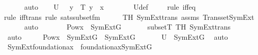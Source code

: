 \begin{isabellebody}
\ \ \ \ \isamarkupfalse%
\ auto\isanewline
\isanewline
\ \ \isamarkupfalse%
\ {\isachardoublequoteopen}U\ {\isacharequal}{\kern0pt}\ {\isacharbraceleft}{\kern0pt}\ y\ {\isasymin}\ T{\isachardot}{\kern0pt}\ y\ {\isasymsubseteq}\ x\ {\isacharbraceright}{\kern0pt}{\isachardoublequoteclose}\ \isanewline
\ \ \ \ \isamarkupfalse%
\ U{\isacharunderscore}{\kern0pt}def\isanewline
\ \ \ \ \isamarkupfalse%
{\isacharparenleft}{\kern0pt}rule\ iff{\isacharunderscore}{\kern0pt}eq{\isacharparenright}{\kern0pt}\isanewline
\ \ \ \ \isamarkupfalse%
{\isacharparenleft}{\kern0pt}rule\ iff{\isacharunderscore}{\kern0pt}trans{\isacharcomma}{\kern0pt}\ rule\ sats{\isacharunderscore}{\kern0pt}subset{\isacharunderscore}{\kern0pt}fm{\isacharparenright}{\kern0pt}\isanewline
\ \ \ \ \isamarkupfalse%
\ TH\ SymExt{\isacharunderscore}{\kern0pt}trans\ assms\ Transset{\isacharunderscore}{\kern0pt}SymExt\isanewline
\ \ \ \ \isamarkupfalse%
\ auto\isanewline
\ \ \isamarkupfalse%
\ \isamarkupfalse%
\ {\isachardoublequoteopen}{\isachardot}{\kern0pt}{\isachardot}{\kern0pt}{\isachardot}{\kern0pt}\ {\isacharequal}{\kern0pt}\ Pow{\isacharparenleft}{\kern0pt}x{\isacharparenright}{\kern0pt}\ {\isasyminter}\ SymExt{\isacharparenleft}{\kern0pt}G{\isacharparenright}{\kern0pt}{\isachardoublequoteclose}\ \isanewline
\ \ \ \ \isamarkupfalse%
\ subsetT\ TH\ SymExt{\isacharunderscore}{\kern0pt}trans\ \isanewline
\ \ \ \ \isamarkupfalse%
\ auto\isanewline
\ \ \isamarkupfalse%
\ \isamarkupfalse%
\ {\isachardoublequoteopen}Pow{\isacharparenleft}{\kern0pt}x{\isacharparenright}{\kern0pt}\ {\isasyminter}\ SymExt{\isacharparenleft}{\kern0pt}G{\isacharparenright}{\kern0pt}\ {\isasymin}\ SymExt{\isacharparenleft}{\kern0pt}G{\isacharparenright}{\kern0pt}{\isachardoublequoteclose}\ \isanewline
\ \ \ \ \isamarkupfalse%
\ {\isacartoucheopen}U\ {\isasymin}\ SymExt{\isacharparenleft}{\kern0pt}G{\isacharparenright}{\kern0pt}{\isacartoucheclose}\ \isamarkupfalse%
\ auto\isanewline
{}\isamarkupfalse%
%
\endisatagproof
{\isafoldproof}%
%
\isadelimproof
\isanewline
%
\endisadelimproof
\isanewline
{}\isamarkupfalse%
\ SymExt{\isacharunderscore}{\kern0pt}foundation{\isacharunderscore}{\kern0pt}ax\ {\isacharcolon}{\kern0pt}\ {\isachardoublequoteopen}foundation{\isacharunderscore}{\kern0pt}ax{\isacharparenleft}{\kern0pt}{\isacharhash}{\kern0pt}{\isacharhash}{\kern0pt}SymExt{\isacharparenleft}{\kern0pt}G{\isacharparenright}{\kern0pt}{\isacharparenright}{\kern0pt}{\isachardoublequoteclose}\ \isanewline

\end{isabellebody}
